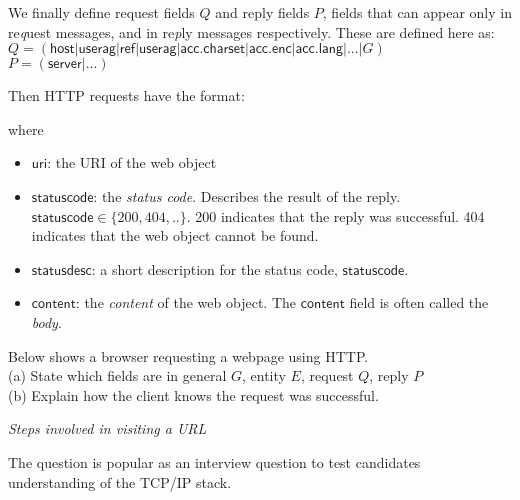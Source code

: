 We finally define request fields $Q$ and reply fields $P$, 
fields that can appear only in re\textit{q}uest messages,
and in re\textit{p}ly messages respectively. These are defined here as: \\
$Q = (\mathsf{host} | \mathsf{userag} | \mathsf{ref} | \mathsf{userag} | \mathsf{acc.charset} 
| \mathsf{acc.enc} | \mathsf{acc.lang}  | ... | G)$\\
$P = (\mathsf{server} | ...)$

Then HTTP requests have the format:


where
\begin{itemize}[nosep]
\renewcommand{\labelitemi}{$\Box$}
\item $\mathsf{uri}$: the URI of the web object
\item $\mathsf{statuscode}$: the \textit{status code}. Describes the result of the reply. 
$\mathsf{statuscode} \in \{200,404, .. \} $. 200 indicates that the reply was 
successful. 404 indicates that the web object cannot be found.
\item $\mathsf{statusdesc}$: a short description for the status code, $\mathsf{statuscode}$.
\item $\mathsf{content}$: the \textit{content} of the web object. 
The $\mathsf{content}$ field is often called the \textit{body}.
\end{itemize}

\frmrule 

\begin{example}
Below shows a browser requesting a webpage using HTTP. \\
(a) State which fields are in general $G$, entity $E$, request $Q$, reply $P$\\
(b) Explain how the client knows the request was successful. 
\end{example}

\frmrule 

\textit{Steps involved in visiting a URL}

The question is popular as an interview question 
to test candidates understanding of the TCP/IP stack. 

